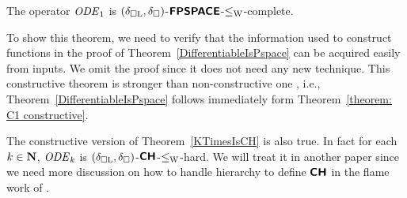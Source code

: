 \begin{theorem}
\label{theorem: C1 constructive}
The operator $\mathit{ODE} _1$ is $(\delta _{\square \mathrm L}, \delta _\square)$-$\text{\bfseries \sffamily \upshape FPSPACE}$-$\leq _{\mathrm W}$-complete.
\end{theorem}

To show this theorem,
we need to verify that the information used to construct functions in the proof of Theorem~\ref{DifferentiableIsPspace}
can be acquired easily from inputs.
We omit the proof since it does not need any new technique.
This constructive theorem is stronger than non-constructive one \cite[Lemma 3.7 and 3.8]{kawamura2010operators}, 
i.e., Theorem~\ref{DifferentiableIsPspace} follows immediately
form Theorem~\ref{theorem: C1 constructive}.

The constructive version of Theorem~\ref{KTimesIsCH} is also true.
In fact for each $k \in \mathbf N$,
$\mathit{ODE} _k$ is $(\delta _{\square \mathrm L}, \delta _\square)$-$\text{\bfseries \sffamily \upshape CH}$-$\leq _{\mathrm W}$-hard.
We will treat it in another paper
since we need more discussion on how to handle hierarchy
to define $\text{\bfseries \sffamily \upshape CH}$ in the flame work of \cite{kawamura2010operators}.

